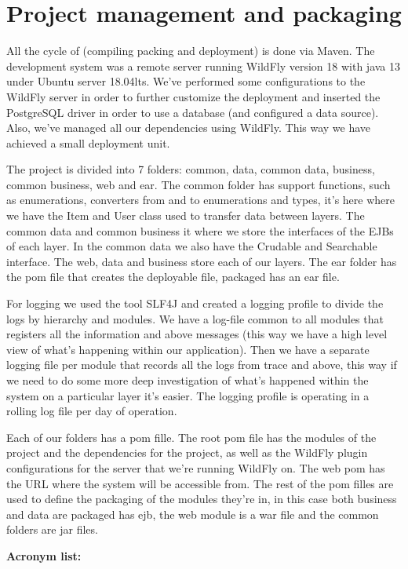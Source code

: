 \documentclass{article}
\begin{document}
\section{Project management and packaging}

\qquad All the cycle of (compiling packing and deployment) is done via Maven. The development system was a remote server running WildFly version 18 with java 13 under Ubuntu server 18.04lts. We've performed some configurations to the WildFly server in order to further customize the deployment and inserted the PostgreSQL driver in order to use a database (and configured a data source). Also, we've managed all our dependencies using WildFly. This way we have achieved a small deployment unit.

\qquad The project is divided into 7 folders: common, data, common data, business, common business, web and ear. The common folder has support functions, such as enumerations, converters from and to enumerations and types, it's here where we have the Item and User class used to transfer data between layers. The common data and common business it where we store the interfaces of the \ac{EJB}s of each layer. In the common data we also have the Crudable and Searchable interface. The web, data and business store each of our layers. The ear folder has the pom file that creates the deployable file, packaged has an ear file.

\qquad For logging we used the tool \ac{SLF4J} and created a logging profile to divide the logs by hierarchy and modules. We have a log-file common to all modules that registers all the information and above messages (this way we have a high level view of what's happening within our application). Then we have a separate logging file per module that records all the logs from trace and above, this way if we need to do some more deep investigation of what's happened within the system on a particular layer it's easier. The logging profile is operating in a rolling log file per day of operation.

\qquad Each of our folders has a pom fille. The root pom file has the modules of the project and the dependencies for the project, as well as the WildFly plugin configurations for the server that we're running WildFly on. The web pom has the URL where the system will be accessible from. The rest of the pom filles are used to define the packaging of the modules they're in, in this case both business and data are packaged has ejb, the web module is a war file and the common folders are jar files.\newline\newline






\textbf{Acronym list:}

\begin{acronym}
\end{acronym}
\end{document}

